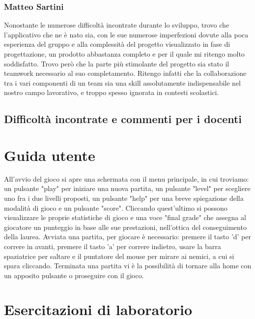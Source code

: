 \documentclass{article}
\begin{document}
\subsubsection{Matteo Sartini}
Nonostante le numerose difficoltà incontrate durante lo sviluppo, trovo che l’applicativo che ne è nato sia, con le sue numerose imperfezioni dovute alla poca esperienza del gruppo e alla complessità del progetto visualizzato in fase di progettazione, un prodotto abbastanza completo e per il quale mi ritengo molto soddisfatto.
Trovo però che la parte più stimolante del progetto sia stato il teamwork necessario al suo completamento. Ritengo infatti che la collaborazione tra i vari componenti di un team sia una skill assolutamente indispensabile nel nostro campo lavorativo, e troppo spesso ignorata in contesti scolastici.
\subsection{Difficoltà incontrate e commenti per i docenti}
\section{Guida utente}
All'avvio del gioco si apre una schermata con il menu principale, in cui troviamo: un pulsante "play" per iniziare una nuova partita, un pulsante "level" per scegliere uno fra i due livelli proposti, un pulsante "help" per una breve spiegazione della modalità di gioco e un pulsante "score". 
Cliccando quest'ultimo si possono visualizzare le proprie statistiche di gioco e una voce "final grade" che assegna al giocatore un punteggio in base alle sue prestazioni, nell'ottica del conseguimento della laurea.
Avviata una partita, per giocare è necessario: premere il tasto 'd' per correre in avanti, premere il tasto 'a' per correre indietro, usare la barra spaziatrice per saltare e il puntatore del mouse per mirare ai nemici, a cui si spara cliccando.
Terminata una partita vi è la possibilità di tornare alla home con un apposito pulsante o proseguire con il gioco.
\section{Esercitazioni di laboratorio}
\end{document}
